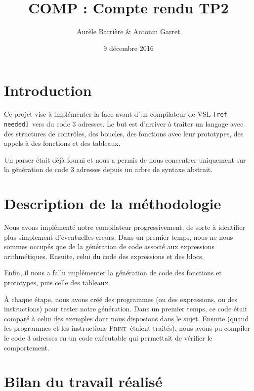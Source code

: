 \documentclass[french]{article}
\title{COMP : Compte rendu TP2}
\author{Aurèle Barrière \& Antonin Garret}
\date{9 décembre 2016}
\begin{document}
\maketitle

\def\refneeded{\texttt{[ref needed]}}
\def\iprint{\textsc{Print}}
\def\iread{\textsc{Read}}
\def\return{\textsc{Return}}

\section{Introduction}
Ce projet vise à implémenter la face avant d'un compilateur de VSL \refneeded\ vers du code 3 adresses.
Le but est d'arriver à traiter un langage avec des structures de contrôles, des boucles, des fonctions avec leur prototypes, des appels à des fonctions et des tableaux.

Un parser était déjà fourni et nous a permis de nous concentrer uniquement sur la génération de code 3 adresses depuis un arbre de syntaxe abstrait.


\section{Description de la méthodologie}
Nous avons implémenté notre compilateur progressivement, de sorte à identifier plus simplement d'éventuelles ereurs. Dans un premier temps, nous ne nous sommes occupés que de la génération de code associé aux expressions arithmétiques. Ensuite, celui du code des expressions et des blocs.

Enfin, il nous a fallu implémenter la génération de code des fonctions et prototypes, puis celle des tableaux.

À chaque étape, nous avons créé des programmes (ou des expressions, ou des instructions) pour tester notre génération. Dans un premier temps, ce code était comparé à celui des exemples dont nous disposions dans le sujet. Ensuite (quand les programmes et les instructions \iprint\ étaient traités), nous avons pu compiler le code 3 adresses en un code exécutable qui permettait de vérifier le comportement.


\section{Bilan du travail réalisé}
\end{document}
